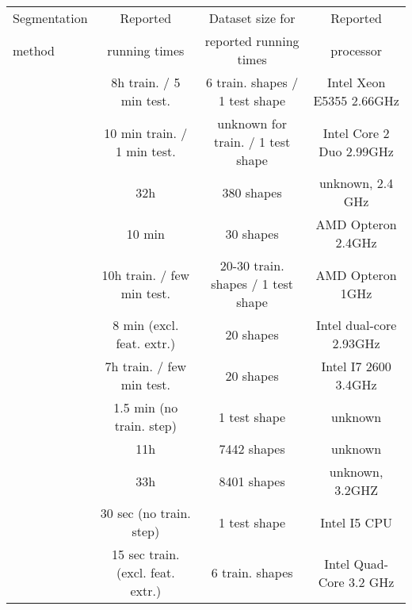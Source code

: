 \begin{table*}[t!]
\small
  \centering
    \begin{tabular}{l|c|c|c}
    \hline
    Segmentation                & Reported                     &  Dataset size for       & Reported \\
    method                      & running times                &  reported running times & processor \\
    \hline
    \hline
    \cite{Kalogerakis:2010:LMS} & 8h train. / 5 min test.      &  6 train. shapes / 1 test shape     & Intel Xeon E5355 2.66GHz \\
    \hline
    \cite{Benhabiles:2011:LBE}  & 10 min train. / 1 min test.  &  unknown for train. / 1 test shape  & Intel Core 2 Duo 2.99GHz \\
    \hline
    \cite{Huang:2011:JSS}       & 32h                          &  380 shapes                         & unknown, 2.4 GHz \\
    \hline
    \cite{Sidi:2011:CS}         & 10 min                       &  30 shapes                          & AMD Opteron 2.4GHz \\
    \hline
    \cite{van-Kaick:2011:PKC}   & 10h train. / few min test.   &  20-30 train. shapes / 1 test shape & AMD Opteron 1GHz  \\
    \hline
    \cite{Hu:2012:CSS}          & 8 min (excl. feat. extr.)    &  20 shapes                          & Intel dual-core 2.93GHz  \\
    \hline
    \cite{Lv:2012:SMS}          & 7h train. / few min test.    &  20 shapes                          & Intel I7 2600 3.4GHz \\
    \hline
    \cite{Wang:2013:PAS}        & 1.5 min (no train. step)     &  1 test shape                       & unknown \\
    \hline
    \cite{Kim:2013:lpt}         & 11h                          &  7442 shapes                        & unknown \\
    \hline
    \cite{Huang:2014:FMN}       & 33h                          &  8401 shapes                        & unknown, 3.2GHZ \\
    \hline
    \cite{Xu:2014:TSS}          & 30 sec (no train. step)      &  1 test shape                       & Intel I5 CPU \\
    \hline
    \cite{Zhige:2014:SSL}       & 15 sec train. (excl. feat. extr.) &  6 train. shapes                & Intel Quad-Core 3.2 GHz \\

\end{tabular}
\end{table*}
